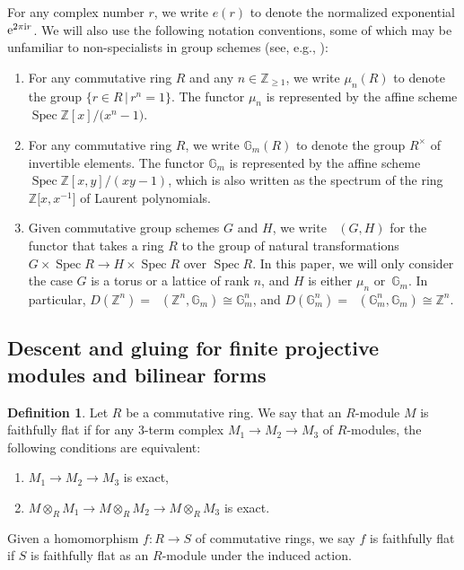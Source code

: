\documentclass[pdftex]{sigma}
\newcommand{\bG}{\mathbb{G}}
\newcommand{\bZ}{\mathbb{Z}}
\DeclareMathOperator{\uHom}{\underline{Hom}}
\DeclareMathOperator{\Spec}{Spec}
\theoremstyle{definition}
\newtheorem{defn}[thm]{Definition}
\begin{document}
For any complex number $r$, we write $e(r)$ to denote the normalized exponential ${\rm e}^{2\pi {\rm i} r}$. We will also use the following notation conventions, some of which may be unfamiliar to non-specialists in group schemes (see, e.g., \cite{SGA3}):
\begin{enumerate}\itemsep=0pt
\item For any commutative ring $R$ and any $n \in \bZ_{\geq 1}$, we write $\mu_n(R)$ to denote the group $\{ r \in R \,|\, r^n = 1\}$. The functor $\mu_n$ is represented by the affine scheme $\Spec \bZ[x]/\big(x^n-1\big)$.
\item For any commutative ring $R$, we write $\bG_m(R)$ to denote the group $R^\times$ of invertible elements. The functor $\bG_m$ is represented by the affine scheme $\Spec \bZ[x,y]/(xy-1)$, which is also written as the spectrum of the ring $\bZ\big[x,x^{-1}\big]$ of Laurent polynomials.
\item Given commutative group schemes $G$ and $H$, we write $\uHom(G,H)$ for the functor that takes a ring $R$ to the group of natural transformations $G \times \Spec R \to H \times \Spec R$ over $\Spec R$. In this paper, we will only consider the case $G$ is a torus or a lattice of rank $n$, and $H$ is either $\mu_n$ or~$\bG_m$. In particular, $D(\bZ^n) = \uHom(\bZ^n,\bG_m) \cong \bG_m^n$, and $D(\bG_m^n) = \uHom(\bG_m^n, \bG_m) \cong \bZ^n$.
\end{enumerate}

\subsection{Descent and gluing for finite projective modules and bilinear forms}

\begin{defn}
Let $R$ be a commutative ring. We say that an $R$-module $M$ is faithfully flat if for any 3-term complex $M_1 \to M_2 \to M_3$ of $R$-modules, the following conditions are equivalent:
\begin{enumerate}\itemsep=0pt
\item[1)] $M_1 \to M_2 \to M_3$ is exact,
\item[2)] $M \otimes_{R} M_1 \to M \otimes_{R} M_2 \to M \otimes_{R} M_3$ is exact.
\end{enumerate}
Given a homomorphism $f\colon R \to S$ of commutative rings, we say $f$ is faithfully flat if $S$ is faithfully flat as an $R$-module under the induced action.
\end{defn}
\end{document}
